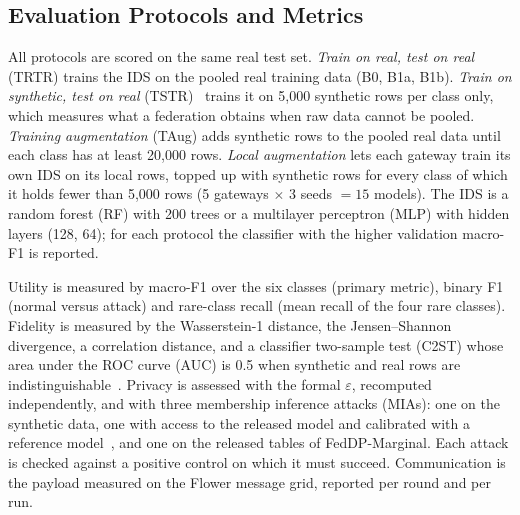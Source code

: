 \documentclass[conference]{IEEEtran}
\begin{document}
\subsection{Evaluation Protocols and Metrics}
All protocols are scored on the same real test set. \textit{Train on real, test on real} (TRTR) trains the IDS on the pooled real training data (B0, B1a, B1b). \textit{Train on synthetic, test on real} (TSTR)~\cite{esteban2017} trains it on 5,000 synthetic rows per class only, which measures what a federation obtains when raw data cannot be pooled. \textit{Training augmentation} (TAug) adds synthetic rows to the pooled real data until each class has at least 20,000 rows. \textit{Local augmentation} lets each gateway train its own IDS on its local rows, topped up with synthetic rows for every class of which it holds fewer than 5,000 rows (5 gateways $\times$ 3 seeds $= 15$ models). The IDS is a random forest (RF) with 200 trees or a multilayer perceptron (MLP) with hidden layers (128, 64); for each protocol the classifier with the higher validation macro-F1 is reported.

Utility is measured by macro-F1 over the six classes (primary metric), binary F1 (normal versus attack) and rare-class recall (mean recall of the four rare classes). Fidelity is measured by the Wasserstein-1 distance, the Jensen--Shannon divergence, a correlation distance, and a classifier two-sample test (C2ST) whose area under the ROC curve (AUC) is 0.5 when synthetic and real rows are indistinguishable~\cite{lopezpaz2017}. Privacy is assessed with the formal $\varepsilon$, recomputed independently, and with three membership inference attacks (MIAs): one on the synthetic data, one with access to the released model and calibrated with a reference model~\cite{carlini2022}, and one on the released tables of FedDP-Marginal. Each attack is checked against a positive control on which it must succeed. Communication is the payload measured on the Flower message grid, reported per round and per run.
\end{document}
